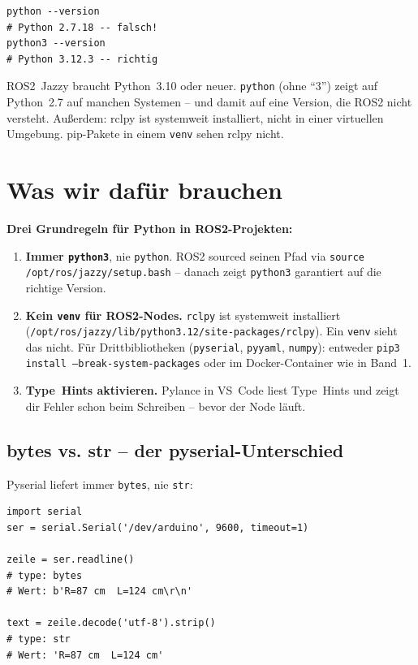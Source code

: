 \begin{lstlisting}
python --version
# Python 2.7.18 -- falsch!
python3 --version
# Python 3.12.3 -- richtig
\end{lstlisting}

\begin{problemBox}
ROS2~Jazzy braucht Python~3.10 oder neuer.
\texttt{python} (ohne "`3"') zeigt auf Python~2.7 auf manchen
Systemen -- und damit auf eine Version, die ROS2 nicht versteht.
Außerdem: rclpy ist systemweit installiert,
nicht in einer virtuellen Umgebung.
pip-Pakete in einem \texttt{venv} sehen rclpy nicht.
\end{problemBox}

\section{Was wir dafür brauchen}

\begin{wissenBox}
\textbf{Drei Grundregeln für Python in ROS2-Projekten:}

\begin{enumerate}
\item \textbf{Immer \texttt{python3}}, nie \texttt{python}.
  ROS2 sourced seinen Pfad via \texttt{source /opt/ros/jazzy/setup.bash} --
  danach zeigt \texttt{python3} garantiert auf die richtige Version.

\item \textbf{Kein \texttt{venv} für ROS2-Nodes.}
  \texttt{rclpy} ist systemweit installiert
  (\texttt{/opt/ros/jazzy/lib/python3.12/site-packages/rclpy}).
  Ein \texttt{venv} sieht das nicht.
  Für Drittbibliotheken (\texttt{pyserial}, \texttt{pyyaml}, \texttt{numpy}):
  entweder \texttt{pip3 install --break-system-packages}
  oder im Docker-Container wie in Band~1.

\item \textbf{Type~Hints aktivieren.}
  Pylance in VS~Code liest Type~Hints und zeigt dir Fehler
  schon beim Schreiben -- bevor der Node läuft.
\end{enumerate}
\end{wissenBox}

\subsection{bytes vs. str – der pyserial-Unterschied}

Pyserial liefert immer \texttt{bytes}, nie \texttt{str}:

\begin{lstlisting}
import serial
ser = serial.Serial('/dev/arduino', 9600, timeout=1)

zeile = ser.readline()
# type: bytes
# Wert: b'R=87 cm  L=124 cm\r\n'

text = zeile.decode('utf-8').strip()
# type: str
# Wert: 'R=87 cm  L=124 cm'
\end{lstlisting}

